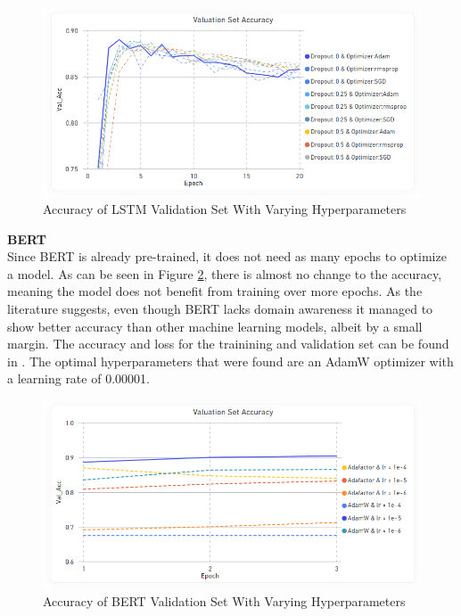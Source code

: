 \documentclass[11pt, a4paper]{article}
\begin{document}
\begin{figure}[!hb]
    \centering
    \includegraphics[scale=0.54]{LSTM_Accuracy_Val_Set.PNG}
    \caption{Accuracy of LSTM Validation Set With Varying Hyperparameters}
    \label{fig:LSTM_Accuracy_Val_Set}
\end{figure}


\noindent\textbf{BERT}\\
Since BERT is already pre-trained, it does not need as many epochs to optimize a model.
As can be seen in Figure \ref{fig:Figure BERT_Accuracy_Validation_Set}, there is almost no change to the accuracy, meaning the model does not benefit from training over more epochs.
As the literature suggests, even though BERT lacks domain awareness it managed to show better accuracy than other machine learning models, albeit by a small margin.
The accuracy and loss for the trainining and validation set can be found in .
The optimal hyperparameters that were found are an AdamW optimizer with a learning rate of 0.00001.\\

\begin{figure}[!htb]
    \centering
    \includegraphics[scale=0.55]{BERT_Accuracy_Validation_Set.PNG}
    \caption{Accuracy of BERT Validation Set With Varying Hyperparameters}
    \label{fig:Figure BERT_Accuracy_Validation_Set}
\end{figure}
\end{document}
